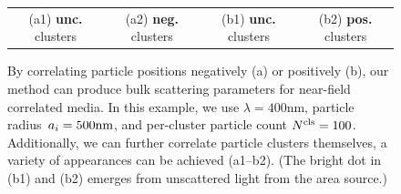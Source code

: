 \begin{figure}
\begin{tabular}{cc|cc}
        \\
        (a1) \textbf{unc.} clusters & (a2) \textbf{neg.} clusters & (b1) \textbf{unc.} clusters & (b2) \textbf{pos.} clusters
    \end{tabular}
    \caption{\label{fig:correlated}
        By correlating particle positions negatively (a) or positively (b), our method can produce bulk scattering parameters for near-field correlated media.
        In this example, we use $\lambda = 400\text{nm}$, particle radius~$a_i = 500\text{nm}$, and per-cluster particle count ${N^\text{cls}} = 100$.
        Additionally, we can further correlate particle clusters themselves, a variety of appearances can be achieved (a1--b2).
        (The bright dot in (b1) and (b2) emerges from unscattered light from the area source.)
    }
\end{figure}

